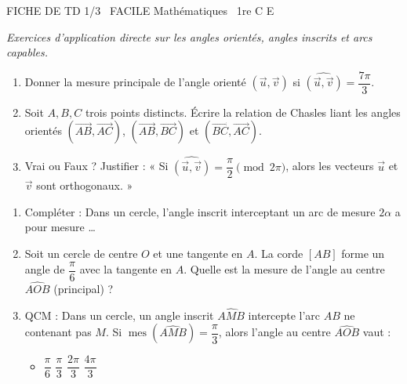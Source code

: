 \documentclass[11pt]{article}
\begin{document}
\begin{tcolorbox}[enhanced,colback=popink,colframe=popink,arc=10pt,boxrule=0pt,left=12pt,right=12pt,top=9pt,bottom=9pt]
{\color{white}\popxbold\small FICHE DE TD 1/3 \textbullet\ FACILE \hfill Mathématiques \textbullet\ 1re C E\par}
\end{tcolorbox}
\vspace{4pt}
\noindent \textit{Exercices d'application directe sur les angles orientés, angles inscrits et arcs capables.}

\begin{exercice}
\begin{enumerate}
    \item Donner la mesure principale de l'angle orienté $(\vec{u}, \vec{v})$ si $\widehat{(\vec{u}, \vec{v})} = \dfrac{7\pi}{3}$.
    \item Soit $A, B, C$ trois points distincts. Écrire la relation de Chasles liant les angles orientés $(\vec{AB}, \vec{AC})$, $(\vec{AB}, \vec{BC})$ et $(\vec{BC}, \vec{AC})$.
    \item Vrai ou Faux ? Justifier : « Si $\widehat{(\vec{u}, \vec{v})} = \dfrac{\pi}{2} \pmod{2\pi}$, alors les vecteurs $\vec{u}$ et $\vec{v}$ sont orthogonaux. »
\end{enumerate}
\end{exercice}

\begin{exercice}
\begin{enumerate}
    \item Compléter : Dans un cercle, l'angle inscrit interceptant un arc de mesure $2\alpha$ a pour mesure \ldots
    \item Soit un cercle de centre $O$ et une tangente en $A$. La corde $[AB]$ forme un angle de $\dfrac{\pi}{6}$ avec la tangente en $A$. Quelle est la mesure de l'angle au centre $\widehat{AOB}$ (principal) ?
    \item QCM : Dans un cercle, un angle inscrit $\widehat{AMB}$ intercepte l'arc $AB$ ne contenant pas $M$. Si $\operatorname{mes}(\widehat{AMB}) = \dfrac{\pi}{3}$, alors l'angle au centre $\widehat{AOB}$ vaut :
    \begin{itemize}
        \item[A)] $\dfrac{\pi}{6}$ \quad [B)] $\dfrac{\pi}{3}$ \quad [C)] $\dfrac{2\pi}{3}$ \quad [D)] $\dfrac{4\pi}{3}$
    \end{itemize}
\end{enumerate}
\end{exercice}
\end{document}
